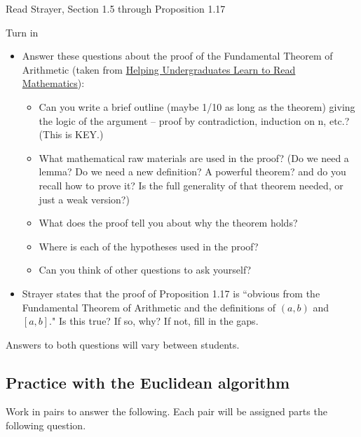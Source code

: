 \documentclass{ximera}
\begin{document}
\begin{pre}
 \item[Read] Strayer, Section 1.5 through Proposition 1.17
 \item[Turn in] 
 \begin{itemize}
	\item Answer these questions about the proof of the Fundamental Theorem of Arithmetic (taken from \href{https://maa.org/node/121566}{Helping Undergraduates Learn to Read Mathematics}):
	
	\begin{itemize}
		\item Can you write a brief outline (maybe 1/10 as long as the theorem) giving the logic of the argument -- proof by contradiction, induction on n, etc.? (This is KEY.)
		\item What mathematical raw materials are used in the proof? (Do we need a lemma? Do we need a new definition? A powerful theorem? and do you recall how to prove it? Is the full generality of that theorem needed, or just a weak version?)
		\item What does the proof tell you about why the theorem holds?
		\item Where is each of the hypotheses used in the proof?
		\item Can you think of other questions to ask yourself?
	\end{itemize}

\item Strayer states that the proof of Proposition 1.17 is ``obvious from the Fundamental Theorem of Arithmetic and the definitions of $(a,b)$ and $[a,b]$." Is this true? If so, why? If not, fill in the gaps.
 \end{itemize}

 
\begin{solution}
Answers to both questions will vary between students.
\end{solution}
\end{pre}

\subsection{Practice with the Euclidean algorithm}

Work in pairs to answer the following. Each pair will be assigned parts the following question.
\end{document}

